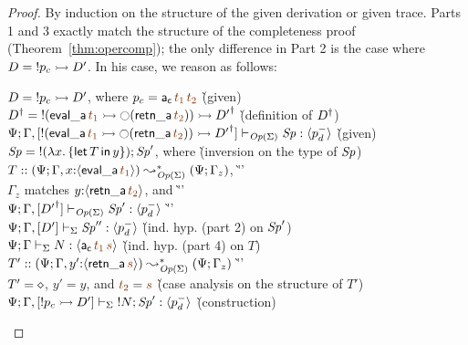 \begin{proof}
By induction on the structure of the given derivation or given trace. Parts 
1 and 3 exactly match the structure of the completeness proof 
(Theorem~\ref{thm:opercomp}); the only difference in Part 2 is the case
where $D = {!}p_c \rightarrowtail D'$. In his case, we reason as follows:

\begin{tabbing}
$D = {!}p_c \rightarrowtail D'$, where $p_c = {\sf a_c}\,\lf{t_1}\,\lf{t_2}$
 \` (given)
\\
$\opsubst{D} = {!}({\sf eval\_a}\,\lf{t_1}
\lefti {\ocircle}({\sf retn\_a}\,\lf{t_2})) \lefti \opsubst{D'}$
 \` (definition of ${{D}^\dag}$)
\\
$\slst{\transop{\Sigma}}{\Psi}{\Gamma, [{!}({\sf eval\_a}\,\lf{t_1}
\lefti {\ocircle}({\sf retn\_a}\,\lf{t_2})) \lefti \opsubst{D'}]}{\Sp}{\susp{p^-_d}}$
 \` (given)
\\
${\it Sp} = {!}{(\lambda x.\,\{{\sf let}\,{T}\,{\sf in}\, {y} \})}; {\it Sp}'$, where
 \` (inversion on the type of ${\it Sp}$)
\\
\qquad $T :: (\Psi; \Gamma, x{:}\susp{{\sf eval\_a}\,\lf{t_1}}) \leadsto^*_{\transop{\Sigma}} (\Psi; \Gamma_z)$,
 \` ''\qquad\qquad~
\\
\qquad $\Gamma_z$ matches $y{:}\susp{{\sf retn\_a}\,\lf{t_2}}$, and
 \` ''\qquad\qquad~
\\
\qquad ${\Psi}; {\Gamma, [{{D'}^\dag}]} \vdash_{{\it Op}({\Sigma})} {{\it Sp}'} : {\langle {p^-_d} \rangle}$
 \` ''\qquad\qquad~
\\
${\Psi}; {\Gamma, [{D'}]} \vdash_{{\Sigma}} {{\it Sp}''} : {\langle {p^-_d} \rangle}$
 \` (ind. hyp. (part 2) on ${\it Sp}'$)
\\
$\slst{\Sigma}{\Psi}{\Gamma}{N}{\susp{{\sf a_c}\,\lf{t_1}\,\lf{s}}}$
 \` (ind. hyp. (part 4) on $T$)
\\
$T' :: (\Psi; \Gamma, y'{:}\susp{{\sf retn\_a}\,\lf{s}})
         \leadsto^*_{\transop{\Sigma}}
       (\Psi; \Gamma_z)$
 \` ''\qquad\qquad~
\\
$T' = \diamond$, $y' = y$, and $\lf{t_2} = \lf{s}$
 \` (case analysis on the structure of $T'$)
\\
${\Psi}; {\Gamma, [{!}p_c \rightarrowtail D']} \vdash_{\Sigma} {{!}{N}; {{\it Sp}'}} : {\langle {p^-_d} \rangle}$
 \` (construction)
\end{tabbing}


\end{proof}
